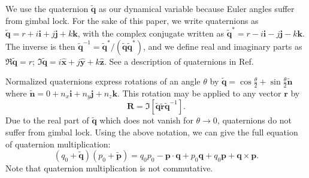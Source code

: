 \documentclass{aastex631}
\newcommand{\unit}[1]{\hat{\mathbf{#1}}}
\newcommand{\brackets}[1]{\left[ #1 \right]}
\newcommand{\quat}[1]{\widetilde{\mathbf{#1}}}
\begin{document}
We use the quaternion $\quat q$ as our dynamical variable because Euler angles suffer from gimbal lock. For the sake of this paper, we write quaternions as $\quat q = r + i \mathbf i + j \mathbf j + k \mathbf k$, with the complex conjugate written as $\quat q^* = r - i \mathbf i - j \mathbf j - k \mathbf k$. The inverse is then $\quat q^{-1} = \quat q^* / (\quat q \quat q^*)$, and we define real and imaginary parts as $\Re \quat q = r$; $\Im \quat q = i \unit x + j \unit y + k \unit z$. See a description of quaternions in Ref.~\cite{2008arXiv0811.2889G}

Normalized quaternions express rotations of an angle $\theta$ by $\quat q = \cos\frac{\theta}{2} + \sin\frac{\theta}{2}\quat n$ where $\quat n = 0 + n_x \mathbf i + n_y \mathbf j + n_z\mathbf k$. This rotation may be applied to any vector $\mathbf r$ by
\begin{equation}
\mathbf R = \Im \brackets{\quat q \quat r\quat q^{-1} }.
\label{eqn:quat-rot}
\end{equation}
Due to the real part of $\quat q$ which does not vanish for $\theta \rightarrow 0$, quaternions do not suffer from gimbal lock. Using the above notation, we can give the full equation of quaternion multiplication:
\begin{equation}
(q_0 + \quat q) (p_0 + \quat p) = q_0 p_0 - \mathbf p \cdot \mathbf q + p_0 \mathbf q + q_0 \mathbf p + \mathbf q \times \mathbf p.
\label{eqn:quat-mult}
\end{equation}
Note that quaternion multiplication is not commutative.
\end{document}

